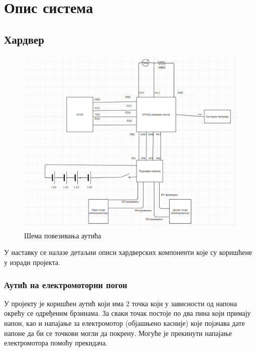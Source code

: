 \chapter{Опис система}
\section{Хардвер}
	\begin{figure}[htb!]
		\begin{center}
			\includegraphics[scale=0.6]{pictures/Schema}
			\caption{Шема повезивања аутића}\label{fig:Schema}
		\end{center}
	\end{figure}

У наставку се налазе детаљни описи хардверских компоненти које су коришћене у изради пројекта. 

\subsection{Аутић на електромоторни погон}
У пројекту је коришћен аутић који има 2 точка који у зависности од напона окрећу се одређеним брзинама. За сваки точак постоје по два пина који примају напон, као и напајање за електромотор (објашњено касније) које појачава дате напоне да би се точкови могли да покрену. Могуће је прекинути напајање електромотора помоћу прекидача.

